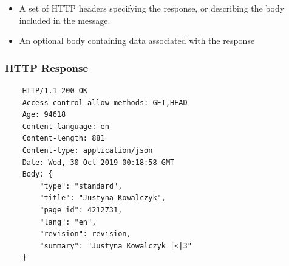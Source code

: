 \documentclass{beamer}
\begin{document}
\begin{frame}
{\begin{itemize}
            \item A set of HTTP headers specifying the response, or describing the body included in the message.
            \item An optional body containing data associated with the response
        \end{itemize}
    }
\end{frame}

\begin{frame}[fragile]
    \frametitle{HTTP Response}
    \begin{verbatim}
    HTTP/1.1 200 OK
    Access-control-allow-methods: GET,HEAD
    Age: 94618
    Content-language: en
    Content-length: 881
    Content-type: application/json
    Date: Wed, 30 Oct 2019 00:18:58 GMT
    Body: {
        "type": "standard",
        "title": "Justyna Kowalczyk",
        "page_id": 4212731,
        "lang": "en",
        "revision": revision,
        "summary": "Justyna Kowalczyk |<|3"
    }
    \end{verbatim}
\end{frame}
\end{document}
